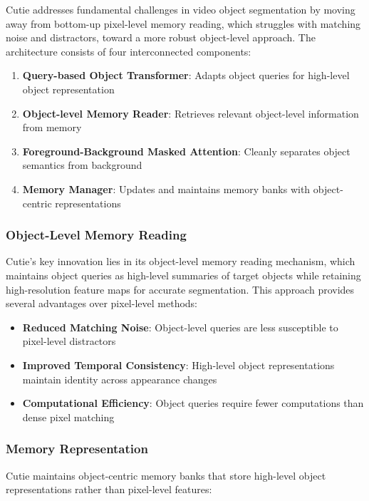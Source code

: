 \documentclass[12pt]{article}
\begin{document}
Cutie addresses fundamental challenges in video object segmentation by moving away from bottom-up pixel-level memory reading, which struggles with matching noise and distractors, toward a more robust object-level approach. The architecture consists of four interconnected components:

\begin{enumerate}
  \item \textbf{Query-based Object Transformer}: Adapts object queries for high-level object representation
  \item \textbf{Object-level Memory Reader}: Retrieves relevant object-level information from memory
  \item \textbf{Foreground-Background Masked Attention}: Cleanly separates object semantics from background
  \item \textbf{Memory Manager}: Updates and maintains memory banks with object-centric representations
\end{enumerate}

\subsubsection{Object-Level Memory Reading}

Cutie's key innovation lies in its object-level memory reading mechanism, which maintains object queries as high-level summaries of target objects while retaining high-resolution feature maps for accurate segmentation. This approach provides several advantages over pixel-level methods:

\begin{itemize}
  \item \textbf{Reduced Matching Noise}: Object-level queries are less susceptible to pixel-level distractors
  \item \textbf{Improved Temporal Consistency}: High-level object representations maintain identity across appearance changes
  \item \textbf{Computational Efficiency}: Object queries require fewer computations than dense pixel matching
\end{itemize}

\subsubsection{Memory Representation}

Cutie maintains object-centric memory banks that store high-level object representations rather than pixel-level features:
\end{document}
